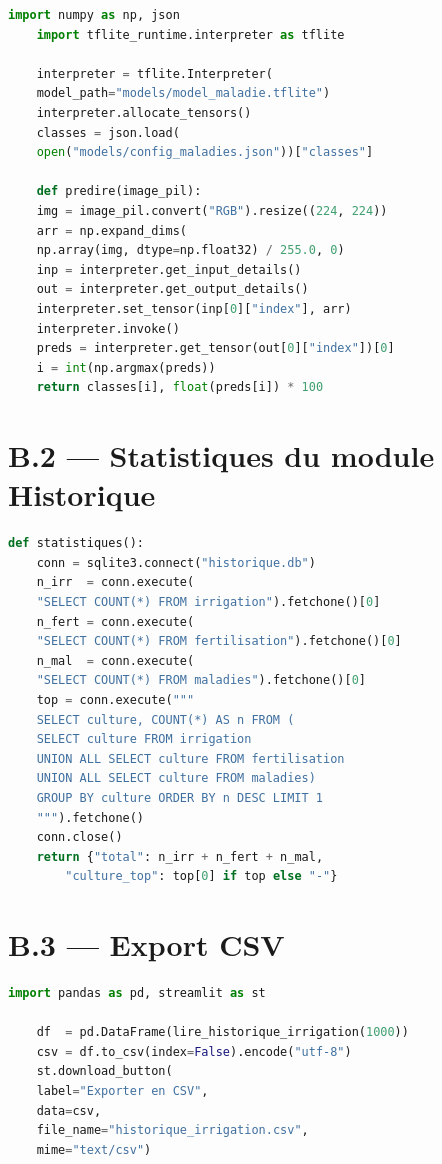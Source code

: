 \begin{lstlisting}[language=Python,
	caption={Chargement et inférence du modèle TFLite},
	label={lst:ann_tflite}]
	import numpy as np, json
	import tflite_runtime.interpreter as tflite
	
	interpreter = tflite.Interpreter(
	model_path="models/model_maladie.tflite")
	interpreter.allocate_tensors()
	classes = json.load(
	open("models/config_maladies.json"))["classes"]
	
	def predire(image_pil):
	img = image_pil.convert("RGB").resize((224, 224))
	arr = np.expand_dims(
	np.array(img, dtype=np.float32) / 255.0, 0)
	inp = interpreter.get_input_details()
	out = interpreter.get_output_details()
	interpreter.set_tensor(inp[0]["index"], arr)
	interpreter.invoke()
	preds = interpreter.get_tensor(out[0]["index"])[0]
	i = int(np.argmax(preds))
	return classes[i], float(preds[i]) * 100
\end{lstlisting}

\section*{B.2 --- Statistiques du module Historique}

\begin{lstlisting}[language=Python,
	caption={Calcul des statistiques globales de l'historique},
	label={lst:ann_stats}]
	def statistiques():
	conn = sqlite3.connect("historique.db")
	n_irr  = conn.execute(
	"SELECT COUNT(*) FROM irrigation").fetchone()[0]
	n_fert = conn.execute(
	"SELECT COUNT(*) FROM fertilisation").fetchone()[0]
	n_mal  = conn.execute(
	"SELECT COUNT(*) FROM maladies").fetchone()[0]
	top = conn.execute("""
	SELECT culture, COUNT(*) AS n FROM (
	SELECT culture FROM irrigation
	UNION ALL SELECT culture FROM fertilisation
	UNION ALL SELECT culture FROM maladies)
	GROUP BY culture ORDER BY n DESC LIMIT 1
	""").fetchone()
	conn.close()
	return {"total": n_irr + n_fert + n_mal,
		"culture_top": top[0] if top else "-"}
\end{lstlisting}

\section*{B.3 --- Export CSV}

\begin{lstlisting}[language=Python,
	caption={Export CSV d'une table de l'historique (Streamlit)},
	label={lst:ann_csv}]
	import pandas as pd, streamlit as st
	
	df  = pd.DataFrame(lire_historique_irrigation(1000))
	csv = df.to_csv(index=False).encode("utf-8")
	st.download_button(
	label="Exporter en CSV",
	data=csv,
	file_name="historique_irrigation.csv",
	mime="text/csv")
\end{lstlisting}

